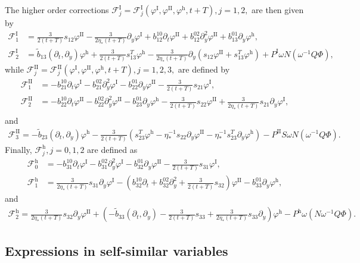 \documentclass[11pt]{article}
\renewcommand{\phi}{\varphi}
\numberwithin{equation}{section}
\numberwithin{prop}{section}
\newcommand{\phih}{\phi^\mathrm{h}}
\newcommand{\phiI}{\phi^\mathrm{I}}
\newcommand{\phiII}{\phi^\mathrm{II}}
\newcommand{\FI}{\mathcal{F}^\mathrm{I}}
\newcommand{\FII}{\mathcal{F}^\mathrm{II}}
\newcommand{\Fh}{\mathcal{F}^\mathrm{h}}
\newcommand{\PI}{P^\mathrm{I}}
\newcommand{\Ph}{P^\mathrm{h}}
\newcommand{\PII}{P^\mathrm{II}}
\begin{document}
The higher order corrections $\FI_j = \FI_j(\phiI, \phiII, \phih, t+T), j = 1,2,$ are then given by
\begin{align*}
\FI_1 &= \frac{3}{2 (t+T)} s_{12} \phiII - \frac{3}{2 \eta_* (t+T)} \partial_y \phiI + b_{12}^{10} \partial_t \phiII + b_{12}^{02} \partial_y^2 \phiII  + b_{13}^{01} \partial_y \phih, \\
\FI_2  &= \tilde{b}_{13} (\partial_t, \partial_y) \phih + \frac{3} {2(t+T)} s_{13}^T \phih - \frac{3}{2 \eta_* (t+T)} \partial_y( s_{12} \phiII + s_{13}^T\phih)  + \PI \omega N (\omega^{-1} Q \Phi),
\end{align*}
while $\FII_j = \FII_j (\phiI, \phiII,\phih, t+T), j = 1, 2, 3,$ are defined by
\begin{align*}
\FII_1 &= - b_{21}^{10} \partial_t \phiI - b_{21}^{02} \partial_y^2 \phiI - b_{22}^{01} \partial_y \phiII - \frac{3}{2 (t+T)} s_{21} \phiI, \\
\FII_2 &=  - b_{22}^{10} \partial_t \phiII - b_{22}^{02} \partial_y^2 \phiII - b_{23}^{01} \partial_y \phih - \frac{3}{2(t+T)} s_{22} \phiII + \frac{3}{2 \eta_*(t+T)} s_{21} \partial_y \phiI, \\
\end{align*}
and 
\begin{align*}
\FII_3 = - \tilde{b}_{23}(\partial_t, \partial_y)\phih - \frac{3}{2 (t+T)} \left( s_{23}^T \phih - \eta_*^{-1} s_{22}\partial_y \phiII- \eta_*^{-1} s_{23}^T \partial_y \phih \right)  - \PII S \omega N (\omega^{-1} Q \Phi). 
\end{align*}
Finally, $\Fh_j, j = 0, 1,2$ are defined as 
\begin{align*}
\Fh_0 &= - b_{31}^{10} \partial_t \phiI - b_{31}^{02} \partial_y^2 \phiI - b_{32}^{01} \partial_y \phiII - \frac{3}{2(t+T)} s_{31} \phiI, \\
\Fh_1 &=  \frac{3}{2 \eta_* (t+T)} s_{31} \partial_y \phiI - \left( b_{32}^{10} \partial_t + b_{32}^{02} \partial_y^2 + \frac{3}{2(t+T)} s_{32} \right) \phiII - b_{33}^{01} \partial_y \phih, 
\end{align*}
and
\begin{align*}
\Fh_2 = \frac{3}{2 \eta_* (t+T)} s_{32} \partial_y  \phiII + \left( -\tilde{b}_{33} (\partial_t, \partial_y) - \frac{3}{2(t+T)} s_{33} + \frac{3}{2\eta_*(t+T)} s_{33} \partial_y \right) \phih 
- \Ph \omega (N \omega^{-1} Q \Phi). 
\end{align*}

\subsection{Expressions in self-similar variables}\label{app: lin ind self sim}
\end{document}
